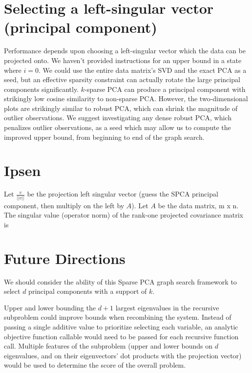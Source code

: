 \documentclass{article}
\begin{document}
\section{Selecting a left-singular vector (principal component)}

Performance depends upon choosing a left-singular vector which the data can be projected onto. We haven't provided instructions for an upper bound in a state where $i=0$. We could use the entire data matrix's SVD and the exact PCA as a seed, but an effective sparsity constraint can actually rotate the large principal components significantly. $k$-sparse PCA can produce a principal component with strikingly low cosine similarity to non-sparse PCA. However, the two-dimensional plots are strikingly similar to robust PCA, which can shrink the magnitude of outlier observations. We suggest investigating any dense robust PCA, which penalizes outlier observations, as a seed which may allow us to compute the improved upper bound, from beginning to end of the graph search.

\section{Ipsen}

Let $\frac{v}{||v||}$ be the projection left singular vector (guess the SPCA principal component, then multiply on the left by $A$). Let $A$ be the data matrix, m x n. The singular value (operator norm) of the rank-one projected covariance matrix is 

\section{Future Directions}

We should consider the ability of this Sparse PCA graph search framework to select $d$ principal components with a support of $k$.


Upper and lower bounding the $d+1$ largest eigenvalues in the recursive subproblem could improve bounds when recombining the system. Instead of passing a single additive value to prioritize selecting each variable, an analytic objective function callable would need to be passed for each recursive function call. Multiple features of the subproblem (upper and lower bounds on $d$ eigenvalues, and on their eigenvectors' dot products with the projection vector) would be used to determine the score of the overall problem.
\end{document}
